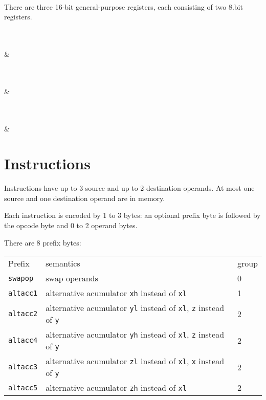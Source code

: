 \documentclass{book}
\begin{document}
\vspace{3mm}
\begin{bytefield}[bitwidth=0.025\linewidth]{16}
	 \\
\end{bytefield}

There are three 16-bit general-purpose registers, each consisting of two 8.bit registers.

\vspace{3mm}
\begin{bytefield}[bitwidth=0.025\linewidth]{16}
	 \\
	 \\
	 &
\end{bytefield}

\vspace{3mm}
\begin{bytefield}[bitwidth=0.025\linewidth]{16}
	 \\
	 \\
	 &
\end{bytefield}

\vspace{3mm}
\begin{bytefield}[bitwidth=0.025\linewidth]{16}
	 \\
	 \\
	 &
\end{bytefield}

\section{Instructions}

Instructions have up to 3 source and up to 2 destination operands. At most one source and one destination operand are in memory.

Each instruction is encoded by 1 to 3 bytes: an optional prefix byte is followed by the opcode byte and 0 to 2 operand bytes.

There are 8 prefix bytes:

\begin{tabular}{l l l}
Prefix & semantics & group \\
\texttt{swapop} & swap operands & 0 \\
\texttt{altacc1} & alternative acumulator \texttt{xh} instead of \texttt{xl} & 1 \\
\texttt{altacc2} & alternative acumulator \texttt{yl} instead of \texttt{xl}, \texttt{z} instead of \texttt{y} & 2 \\
\texttt{altacc4} & alternative acumulator \texttt{yh} instead of \texttt{xl}, \texttt{z} instead of \texttt{y} & 2 \\
\texttt{altacc3} & alternative acumulator \texttt{zl} instead of \texttt{xl}, \texttt{x} instead of \texttt{y} & 2 \\
\texttt{altacc5} & alternative acumulator \texttt{zh} instead of \texttt{xl} & 2
\end{tabular}
\end{document}
